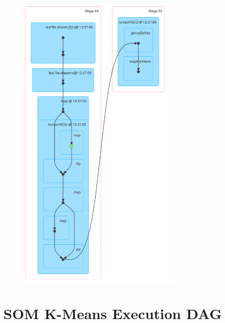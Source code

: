 \documentclass{l4proj}
\begin{document}
\begin{appendices}
\begin{figure}[H]
	\centering
    \label{fig:dag7}
    \includegraphics[width=0.73\textwidth]{images/DAG7}
\end{figure}

\section{SOM K-Means Execution DAG}


\end{appendices}
\end{document}
